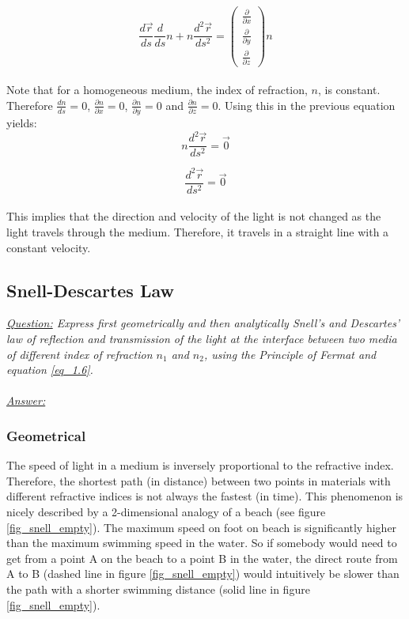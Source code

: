 \documentclass{article}
\def\Nabla{
	\begin{pmatrix}
		\frac{\partial}{\partial {x}} \\
		\frac{\partial}{\partial {y}} \\
		\frac{\partial}{\partial {z}}
	\end{pmatrix}}
\begin{document}
\begin{equation*}
	\frac{d \vec{r}}{ds} \frac{d}{ds} n + n \frac{d^2 \vec{r}}{ds^2} = \Nabla n
\end{equation*} \\

Note that for a homogeneous medium, the index of refraction, $n$, is constant. Therefore $\frac{dn}{ds} = 0$, $\frac{\partial n}{\partial x} = 0$, $\frac{\partial n}{\partial y} = 0$ and $\frac{\partial n}{\partial z} = 0$. Using this in the previous equation yields: \\

\begin{equation*}
	 n \frac{d^2 \vec{r}}{ds^2} = \vec{0}
\end{equation*}

\begin{equation*}
	 \frac{d^2 \vec{r}}{ds^2} = \vec{0}
\end{equation*} \\


This implies that the direction and velocity of the light is not changed as the light travels through the medium. Therefore, it travels in a straight line with a constant velocity.\\

\newpage
\subsection{Snell-Descartes Law}

\textit{\underline{Question:} Express first geometrically and then analytically Snell's and Descartes' law of reflection and transmission of the light at the interface between two media of different index of refraction $n_1$ and $n_2$, using the Principle of Fermat and equation \ref{eq_1.6}.}\\
\\
\textit{\underline{Answer:}} \\
\subsubsection{Geometrical}
The speed of light in a medium is inversely proportional to the refractive index. Therefore, the shortest path (in distance) between two points in materials with different refractive indices is not always the fastest (in time). This phenomenon is nicely described by a 2-dimensional analogy of a beach (see figure \ref{fig_snell_empty}). The maximum speed on foot on beach is significantly higher than the maximum swimming speed in the water. So if somebody would need to get from a point A on the beach to a point B in the water, the direct route from A to B (dashed line in figure \ref{fig_snell_empty}) would intuitively be slower than the path with a shorter swimming distance (solid line in figure \ref{fig_snell_empty}).
\end{document}
